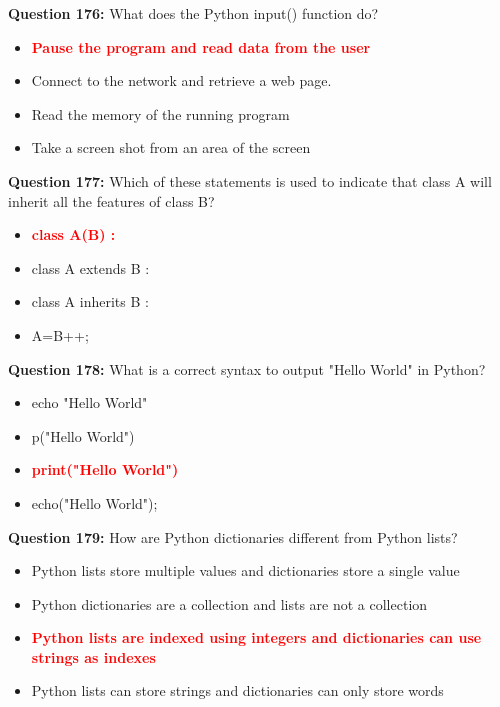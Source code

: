 \documentclass[12pt,a4paper]{article}
\begin{document}
\vspace{0.5cm}

\textbf{Question 176:} What does the Python input() function do?

\begin{itemize}
    \item[\textbf{A.}] \textcolor{red}{\textbf{Pause the program and read data from the user}}
    \item[\textbf{B.}] Connect to the network and retrieve a web page.
    \item[\textbf{C.}] Read the memory of the running program
    \item[\textbf{D.}] Take a screen shot from an area of the screen
\end{itemize}

\vspace{0.5cm}

\textbf{Question 177:} Which of these statements is used to indicate that class A will inherit all the features of class B?

\begin{itemize}
    \item[\textbf{A.}] \textcolor{red}{\textbf{class A(B) :}}
    \item[\textbf{B.}] class A extends B :
    \item[\textbf{C.}] class A inherits B :
    \item[\textbf{D.}] A=B++;
\end{itemize}

\vspace{0.5cm}

\textbf{Question 178:} What is a correct syntax to output "Hello World" in Python?

\begin{itemize}
    \item[\textbf{A.}] echo "Hello World"
    \item[\textbf{B.}] p("Hello World")
    \item[\textbf{C.}] \textcolor{red}{\textbf{print("Hello World")}}
    \item[\textbf{D.}] echo("Hello World");
\end{itemize}

\vspace{0.5cm}

\textbf{Question 179:} How are Python dictionaries different from Python lists?

\begin{itemize}
    \item[\textbf{A.}] Python lists store multiple values and dictionaries store a single value
    \item[\textbf{B.}] Python dictionaries are a collection and lists are not a collection
    \item[\textbf{C.}] \textcolor{red}{\textbf{Python lists are indexed using integers and dictionaries can use strings as indexes}}
    \item[\textbf{D.}] Python lists can store strings and dictionaries can only store words
\end{itemize}
\end{document}
